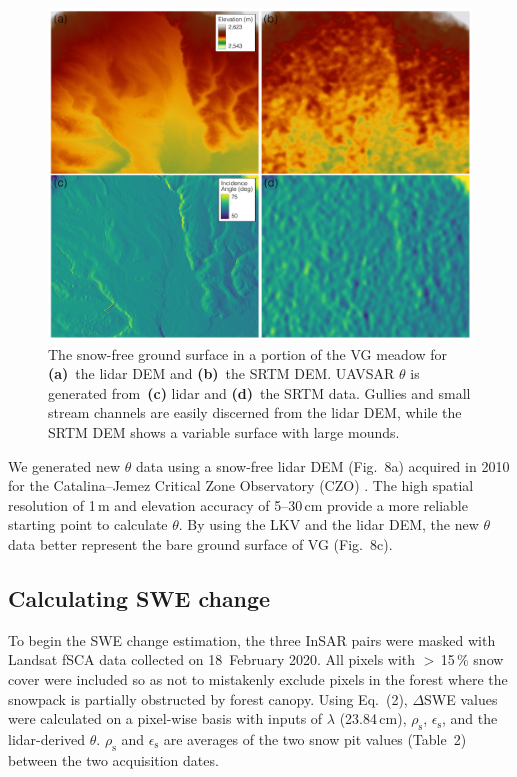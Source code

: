 \begin{figure}[t]
\includegraphics[width=14cm]{figures/ch3_figs/fig08.pdf}
\caption{The snow-free ground surface in a portion of the VG meadow for \textbf{(a)}~the lidar DEM and \textbf{(b)}~the SRTM DEM. UAVSAR $\theta$ is generated from~\textbf{(c)} lidar and \textbf{(d)}~the SRTM data. Gullies and small stream channels are easily discerned from the lidar DEM, while the SRTM DEM shows a variable surface with large mounds.}
\end{figure}

We generated new $\theta$ data using a snow-free lidar DEM (Fig.~8a) acquired in 2010 for the Catalina--Jemez Critical Zone Observatory (CZO) \citep{opentopographyJemezRiverBasin2012}. The high spatial resolution of 1\,m and elevation accuracy of 5--30\,cm provide a more reliable starting point to calculate $\theta$. By using the LKV and the lidar DEM, the new $\theta$ data better represent the bare ground surface of VG (Fig.~8c).


\hypertarget{ch3-methods-12}{\subsection{Calculating SWE change}\label{ch3-methods-12}}


To begin the SWE change estimation, the three InSAR pairs were masked with Landsat fSCA data collected on 18~February 2020. All pixels with $>$\,15\,\% snow cover were included so as not to mistakenly exclude pixels in the forest where the snowpack is partially obstructed by forest canopy. Using Eq.~(2), $\Delta$SWE values were calculated on a pixel-wise basis with inputs of $\lambda$ (23.84\,cm), $\rho_\mathrm{s}$, $\epsilon_\mathrm{s}$, and the lidar-derived $\theta$. $\rho_\mathrm{s}$ and $\epsilon_\mathrm{s}$ are averages of the two snow pit values (Table~2) between the two acquisition dates.

